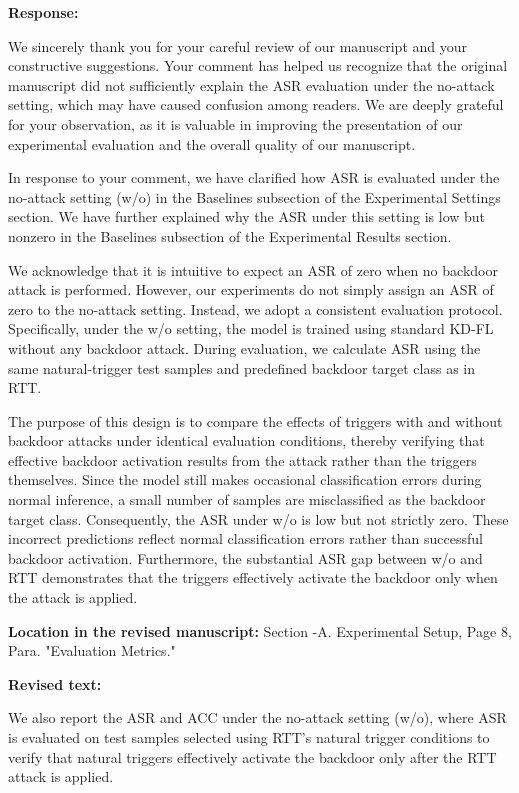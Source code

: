 \documentclass[11pt,a4paper]{article}
\newcommand{\manualindent}{\par\noindent\hspace*{1.5em}\ignorespaces}
\newcommand{\authorresponse}[1]{%
  {\bfseries\color{replyblue}Response:}\par
  #1\par\vspace{0.35em}%
}
\newcommand{\revisedtext}[2]{%
  {\bfseries\color{headingnavy}Location in the revised manuscript:} #1\par
  \begin{tcolorbox}[
      enhanced,breakable,colback=replyblue!3,colframe=replyblue!18,
      before upper={\setlength{\parskip}{6pt}},
      borderline west={2.5pt}{0pt}{replyblue},
      boxrule=0.5pt,arc=1mm,left=11pt,right=9pt,top=8pt,bottom=8pt]
    {\bfseries\color{headingnavy}Revised text:}\par
    #2
  \end{tcolorbox}
  \vspace{0.35em}%
}
\begin{document}
\authorresponse{\manualindent We sincerely thank you for your careful review of our manuscript and your constructive suggestions. 
Your comment has helped us recognize that the original manuscript did not sufficiently explain the ASR evaluation under the no-attack setting, which may have caused confusion among readers. 
We are deeply grateful for your observation, as it is valuable in improving the presentation of our experimental evaluation and the overall quality of our manuscript.

\manualindent In response to your comment, we have clarified how ASR is evaluated under the no-attack setting (w/o) in the Baselines subsection of the Experimental Settings section. 
We have further explained why the ASR under this setting is low but nonzero in the Baselines subsection of the Experimental Results section.

\manualindent We acknowledge that it is intuitive to expect an ASR of zero when no backdoor attack is performed. 
However, our experiments do not simply assign an ASR of zero to the no-attack setting. Instead, we adopt a consistent evaluation protocol. 
Specifically, under the w/o setting, the model is trained using standard KD-FL without any backdoor attack. 
During evaluation, we calculate ASR using the same natural-trigger test samples and predefined backdoor target class as in RTT.

\manualindent The purpose of this design is to compare the effects of triggers with and without backdoor attacks under identical evaluation conditions, thereby verifying that effective backdoor activation results from the attack rather than the triggers themselves. 
Since the model still makes occasional classification errors during normal inference, a small number of samples are misclassified as the backdoor target class. Consequently, the ASR under w/o is low but not strictly zero. 
These incorrect predictions reflect normal classification errors rather than successful backdoor activation. Furthermore, the substantial ASR gap between w/o and RTT demonstrates that the triggers effectively activate the backdoor only when the attack is applied.}

\revisedtext{Section \uppercase\expandafter{}-A. Experimental Setup, Page 8, Para. "Evaluation Metrics."}
{\manualindent We also report the ASR and ACC under the no-attack setting (w/o), where ASR is evaluated on test samples selected using RTT's natural trigger conditions to verify that natural triggers effectively activate the backdoor only after the RTT attack is applied.}
\end{document}
